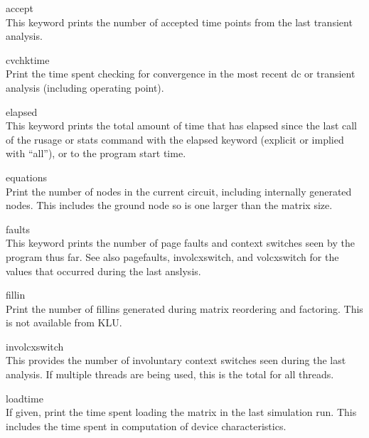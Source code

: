 \begin{description}
\item{\vt accept}\\
This keyword prints the number of accepted time points from the last
transient analysis.

\item{\vt cvchktime}\\
Print the time spent checking for convergence in the most recent dc or
transient analysis (including operating point).

\item{\vt elapsed}\\
This keyword prints the total amount of time that has elapsed since
the last call of the {\cb rusage} or {\cb stats} command with the {\vt
elapsed} keyword (explicit or implied with ``{\vt all}''), or to the
program start time.

\item{\vt equations}\\
Print the number of nodes in the current circuit, including internally
generated nodes.  This includes the ground node so is one larger than
the matrix size.

\item{\vt faults}\\
This keyword prints the number of page faults and context switches
seen by the program thus far.  See also {\et pagefaults}, {\et
involcxswitch}, and {\et volcxswitch} for the values that occurred
during the last anslysis.

\item{\vt fillin}\\
Print the number of fillins generated during matrix reordering and
factoring.  This is not available from KLU.

\item{\vt involcxswitch}\\
This provides the number of involuntary context switches seen during
the last analysis.  If multiple threads are being used, this is the
total for all threads.

\item{\vt loadtime}\\
If given, print the time spent loading the matrix in the last
simulation run.  This includes the time spent in computation of device
characteristics.


\end{description}
